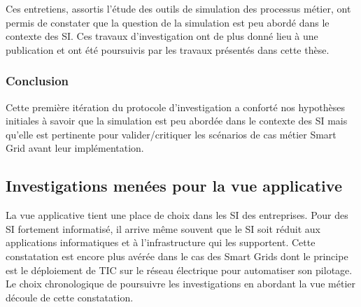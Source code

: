 			Ces entretiens, assortis l'étude des outils de simulation des processus 
métier, ont permis de constater que la question de la simulation est peu abordé 
dans le contexte des SI. Ces travaux d'investigation ont de plus donné lieu à 
une publication \cite{seghiri2012animation} et ont été poursuivis par les 
travaux présentés dans cette thèse.
 
				\subsubsection{Conclusion}
			Cette première itération du protocole d'investigation a conforté nos hypothèses initiales à savoir que la simulation est peu abordée dans le contexte des SI mais qu'elle est pertinente pour valider/critiquer les scénarios de cas métier Smart Grid avant leur implémentation.

			\subsection{Investigations menées pour la vue applicative} 
				La vue applicative tient une place de choix dans les SI des entreprises. Pour des SI fortement informatisé, il arrive même souvent que le SI soit réduit aux applications informatiques et à l'infrastructure qui les supportent. Cette constatation est encore plus avérée dans le cas des Smart Grids dont le principe est le déploiement de TIC sur le réseau électrique pour automatiser son pilotage. Le choix chronologique de poursuivre les investigations en abordant la vue métier découle de cette constatation.		
			
